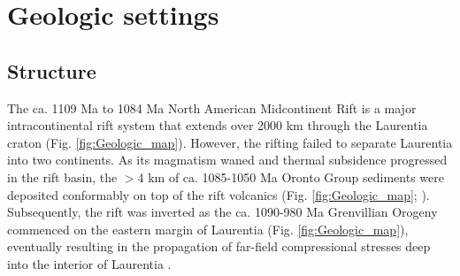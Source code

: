 \documentclass[draft]{agujournal2019}
\begin{document}


\section*{Geologic settings}

\subsection*{Structure}
The ca. 1109 Ma to 1084 Ma North American Midcontinent Rift is a major intracontinental rift system that extends over 2000 km through the Laurentia craton (Fig. \ref{fig:Geologic_map}). However, the rifting failed to separate Laurentia into two continents. As its magmatism waned and thermal subsidence progressed in the rift basin, the $>$4 km of ca. 1085-1050 Ma Oronto Group sediments \cite{Fairchild2017a, Swanson-Hysell2019a} were deposited conformably on top of the rift volcanics (Fig. \ref{fig:Geologic_map}; ). Subsequently, the rift was inverted as the ca. 1090-980 Ma Grenvillian Orogeny commenced on the eastern margin of Laurentia (Fig. \ref{fig:Geologic_map}), eventually resulting in the propagation of far-field compressional stresses deep into the interior of Laurentia \cite{Cannon1993a, Cannon1994a}. 
\end{document}
